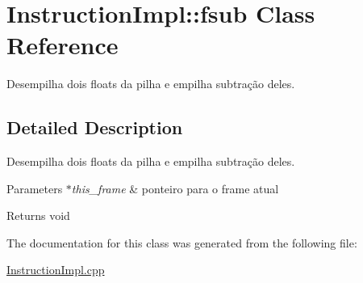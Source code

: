 \hypertarget{class_instruction_impl_1_1fsub}{}\section{Instruction\+Impl\+:\+:fsub Class Reference}
\label{class_instruction_impl_1_1fsub}


Desempilha dois floats da pilha e empilha subtração deles.  




\subsection{Detailed Description}
Desempilha dois floats da pilha e empilha subtração deles. 


\begin{DoxyParams}{Parameters}
{\em $\ast$this\+\_\+frame} & ponteiro para o frame atual \\
\hline
\end{DoxyParams}
\begin{DoxyReturn}{Returns}
void 
\end{DoxyReturn}


The documentation for this class was generated from the following file\+:\begin{DoxyCompactItemize}
\item 
\hyperlink{_instruction_impl_8cpp}{Instruction\+Impl.\+cpp}\end{DoxyCompactItemize}

